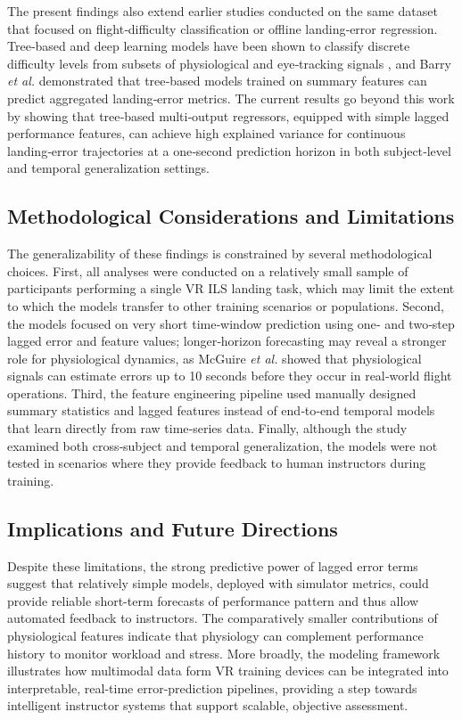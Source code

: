 \documentclass[11pt, a4paper]{article}
\begin{document}
The present findings also extend earlier studies conducted on the same dataset that focused on flight‑difficulty classification or offline landing‑error regression. Tree‑based and deep learning models have been shown to classify discrete difficulty levels from subsets of physiological and eye‑tracking signals \cite{caballero-2023, moore-2023}, and Barry \emph{et al.} \cite{barry-2025} demonstrated that tree‑based models trained on summary features can predict aggregated landing‑error metrics. The current results go beyond this work by showing that tree‑based multi‑output regressors, equipped with simple lagged performance features, can achieve high explained variance for continuous landing‑error trajectories at a one‑second prediction horizon in both subject‑level and temporal generalization settings.

\subsection{Methodological Considerations and Limitations}
The generalizability of these findings is constrained by several methodological choices. First, all analyses were conducted on a relatively small sample of participants performing a single VR ILS landing task, which may limit the extent to which the models transfer to other training scenarios or populations. Second, the models focused on very short time‑window prediction using one‑ and two‑step lagged error and feature values; longer‑horizon forecasting may reveal a stronger role for physiological dynamics, as McGuire \emph{et al.} \cite{mcguire-2026} showed that physiological signals can estimate errors up to 10 seconds before they occur in real‑world flight operations. Third, the feature engineering pipeline used manually designed summary statistics and lagged features instead of end‑to‑end temporal models that learn directly from raw time‑series data. Finally, although the study examined both cross‑subject and temporal generalization, the models were not tested in scenarios where they provide feedback to human instructors during training.

\subsection{Implications and Future Directions}
Despite these limitations, the strong predictive power of lagged error terms suggest that relatively simple models, deployed with simulator metrics, could provide reliable short-term forecasts of performance pattern and thus allow automated feedback to instructors. The comparatively smaller contributions of physiological features indicate that physiology can complement performance history to monitor workload and stress. More broadly, the modeling framework illustrates how multimodal data form VR training devices can be integrated into interpretable, real-time error-prediction pipelines, providing a step towards intelligent instructor systems that support scalable, objective assessment.
\end{document}
